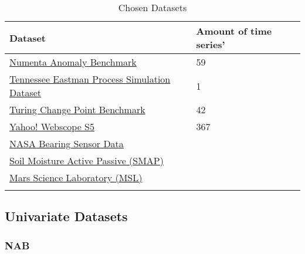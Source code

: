 \begin{table}[h]\centering
        \begin{tabular}{ll}
            Dataset                                                                                                                             & Amount of time series'\\\midrule
            \href{https://github.com/numenta/NAB}{Numenta Anomaly Benchmark}                                                                    &  59   \\\addlinespace
            \href{https://www.kaggle.com/averkij/tennessee-eastman-process-simulation-dataset}{Tennessee Eastman Process Simulation Dataset}    &  1    \\\addlinespace
            \href{https://github.com/alan-turing-institute/TCPDBench}{Turing Change Point Benchmark}                                            &  42   \\\addlinespace
            \href{https://webscope.sandbox.yahoo.com/catalog.php?datatype=s\&did=70}{Yahoo! Webscope S5}                                        &  367  \\\addlinespace
            \href{https://www.kaggle.com/rkuo2000/nasa-bearing-sensor-data/notebooks}{NASA Bearing Sensor Data}                                 &                   \\\addlinespace
            \href{https://github.com/khundman/telemanom}{Soil Moisture Active Passive (SMAP)}                                                   &                   \\\addlinespace
            \href{https://github.com/khundman/telemanom}{Mars Science Laboratory  (MSL)}                                                        &                   \\\addlinespace
        \end{tabular}
        \caption{Chosen Datasets}\label{tab:chosen-datasets}
\end{table}



\subsection{Univariate Datasets}
\subsubsection{NAB}

